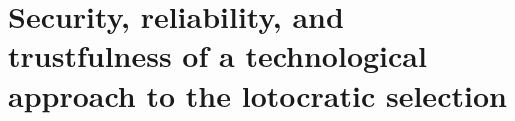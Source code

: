 \section{Security, reliability, and trustfulness of a technological approach to the lotocratic selection}\label{sec:security_etc}



